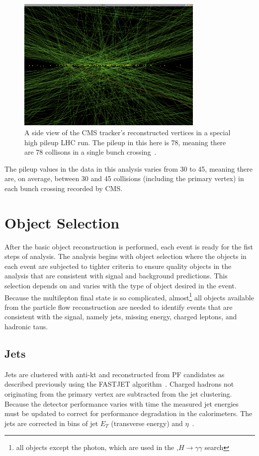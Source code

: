 \begin{figure}[hbtp]
 \begin{center}
   \includegraphics[width=0.8\textwidth]{ch4_figs/cms_pileup.pdf}
   \caption{A side view of the CMS tracker's reconstructed vertices in a special high pileup LHC run. The pileup in this here is 78, meaning there are
78 collisons in a single bunch crossing~\cite{pileup_image}.}
   \label{fig:pileup_vertices}
 \end{center}
\end{figure}

\noindent The pileup values in the data in this analysis varies from 30 to 45, meaning there are, on average, between 30 and 45 collisions (including the primary vertex) in each
bunch crossing recorded by CMS. 


\section{Object Selection}
After the basic object reconstruction is performed, each event is ready for the fist steps of analysis. The analysis begins with object selection where the objects in each
event are subjected to tighter criteria to ensure quality objects in the analysis that are consistent with signal and background predictions. This selection depends on and 
varies with the type of object desired in the event. Because the \tth multilepton final state is so complicated, almost\footnote{all objects except the photon, which are
used in the \tth,$H\rightarrow\gamma\gamma$ search} all objects available from the particle flow
reconstruction are needed to identify events that are consistent with the signal, namely jets, missing energy, charged leptons, and hadronic taus.

\subsection{Jets}
Jets are clustered with anti-kt and reconstructed from PF candidates as described previously using the FASTJET algorithm~\cite{antikt}\cite{fastjet}.
Charged hadrons not originating from the primary vertex are subtracted from the jet clustering. Because the detector performance varies with time the measured jet energies
must be updated to correct for performance degradation in the calorimeters. The jets are corrected in bins of jet $E_{T}$ (transverse energy) and $\eta$~\cite{jec}.

